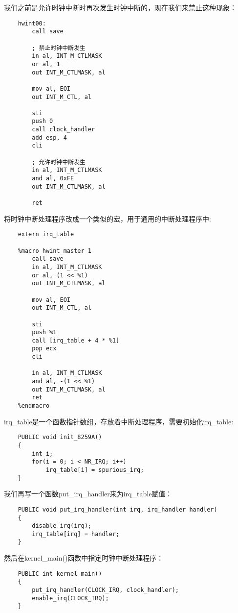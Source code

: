 \documentclass[a4paper,left=2.5cm,right=2.5cm,11pt]{report}
\begin{document}
	我们之前是允许时钟中断时再次发生时钟中断的，现在我们来禁止这种现象：
	\begin{lstlisting}
	hwint00:
		call save

		; 禁止时钟中断发生
		in al, INT_M_CTLMASK
		or al, 1
		out INT_M_CTLMASK, al

		mov al, EOI
		out INT_M_CTL, al

		sti
		push 0
		call clock_handler
		add esp, 4
		cli

		; 允许时钟中断发生
		in al, INT_M_CTLMASK
		and al, 0xFE
		out INT_M_CTLMASK, al

		ret
	\end{lstlisting}

	将时钟中断处理程序改成一个类似的宏，用于通用的中断处理程序中:
	\begin{lstlisting}
	extern irq_table

	%macro hwint_master 1
		call save
		in al, INT_M_CTLMASK
		or al, (1 << %1)
		out INT_M_CTLMASK, al

		mov al, EOI
		out INT_M_CTL, al

		sti
		push %1
		call [irq_table + 4 * %1]
		pop ecx
		cli

		in al, INT_M_CTLMASK
		and al, -(1 << %1)
		out INT_M_CTLMASK, al
		ret
	%endmacro
	\end{lstlisting}

	irq\_table是一个函数指针数组，存放着中断处理程序，需要初始化irq\_table:
	\begin{lstlisting}
	PUBLIC void init_8259A()
	{
		int i;
		for(i = 0; i < NR_IRQ; i++)
			irq_table[i] = spurious_irq;
	}
	\end{lstlisting}

	我们再写一个函数put\_irq\_handler来为irq\_table赋值：
	\begin{lstlisting}
	PUBLIC void put_irq_handler(int irq, irq_handler handler)
	{
		disable_irq(irq);
		irq_table[irq] = handler;
	}
	\end{lstlisting}

	然后在kernel\_main()函数中指定时钟中断处理程序：
	\begin{lstlisting}
	PUBLIC int kernel_main()
	{
		put_irq_handler(CLOCK_IRQ, clock_handler);
		enable_irq(CLOCK_IRQ);
	}
	\end{lstlisting}
\end{document}
